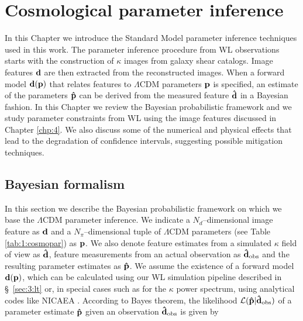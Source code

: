 
\chapter{Cosmological parameter inference}
 \thispagestyle{plain}
\setlength{\parindent}{10mm}
\label{chp:5}


In this Chapter we introduce the Standard Model parameter inference techniques used in this work. The parameter inference procedure from WL observations starts with the construction of $\kappa$ images from galaxy shear catalogs. Image features $\mathbf{d}$ are then extracted from the reconstructed images. When a forward model $\mathbf{d}(\mathbf{p})$ that relates features to $\Lambda$CDM parameters $\mathbf{p}$ is specified, an estimate of the parameters $\mathbf{\hat{p}}$ can be derived from the measured feature $\mathbf{\hat{d}}$ in a Bayesian fashion. In this Chapter we review the Bayesian probabilistic framework and we study parameter constraints from WL using the image features discussed in Chapter \ref{chp:4}. We also discuss some of the numerical and physical effects that lead to the degradation of confidence intervals, suggesting possible mitigation techniques.    

\section{Bayesian formalism}
\label{sec:5:bayes}
In this section we describe the Bayesian probabilistic framework on which we base the $\Lambda$CDM parameter inference. We indicate a $N_d$--dimensional image feature as $\mathbf{d}$ and a $N_\pi$--dimensional tuple of $\Lambda$CDM parameters (see Table \ref{tab:1:cosmopar}) as $\mathbf{p}$. We also denote feature estimates from a simulated $\kappa$ field of view as $\mathbf{\hat{d}}$, feature measurements from an actual observation as $\mathbf{\hat{d}}_{\rm obs}$ and the resulting parameter estimates as $\mathbf{\hat{p}}$. We assume the existence of a forward model $\mathbf{d}(\mathbf{p})$, which can be calculated using our WL simulation pipeline described in \S~\ref{sec:3:lt} or, in special cases such as for the $\kappa$ power spectrum, using analytical codes like NICAEA \citep{Nicaea,Nicaea17}. According to Bayes theorem, the likelihood $\mathcal{L}(\mathbf{\hat{p}}\vert\mathbf{\hat{d}}_{\rm obs})$ of a parameter estimate $\mathbf{\hat{p}}$ given an observation $\mathbf{\hat{d}}_{\rm obs}$ is given by

